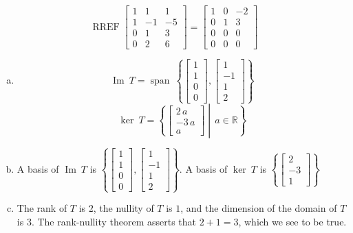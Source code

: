\begin{exerciseAnswer} 


\[\operatorname{RREF} \left[\begin{array}{ccc}
1 & 1 & 1 \\
1 & -1 & -5 \\
0 & 1 & 3 \\
0 & 2 & 6
\end{array}\right] = \left[\begin{array}{ccc}
1 & 0 & -2 \\
0 & 1 & 3 \\
0 & 0 & 0 \\
0 & 0 & 0
\end{array}\right] \]


\begin{enumerate}[(a)]
\item \[\operatorname{Im}\ T = \operatorname{span}\  \left\{ \left[\begin{array}{c}
1 \\
1 \\
0 \\
0
\end{array}\right] , \left[\begin{array}{c}
1 \\
-1 \\
1 \\
2
\end{array}\right] \right\} \]\[\operatorname{ker}\ T =  \left\{ \left[\begin{array}{c}
2 \, a \\
-3 \, a \\
a
\end{array}\right] \middle|\,a\in\mathbb{R}\right\} \]
\item  A basis of \(\operatorname{Im}\ T\) is \( \left\{ \left[\begin{array}{c}
1 \\
1 \\
0 \\
0
\end{array}\right] , \left[\begin{array}{c}
1 \\
-1 \\
1 \\
2
\end{array}\right] \right\} \). A basis of \(\operatorname{ker}\ T\) is \( \left\{ \left[\begin{array}{c}
2 \\
-3 \\
1
\end{array}\right] \right\} \)
\item  The rank of \(T\) is \( 2 \), the nullity of \(T\) is \( 1 \), and the dimension of the domain of \(T\) is \( 3 \). The rank-nullity theorem asserts that \( 2 + 1 = 3 \), which we see to be true. 
\end{enumerate}
    
\end{exerciseAnswer}
    
